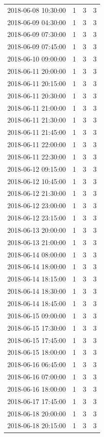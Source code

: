 \begin{tabular}{lrrr}
2018-06-08 10:30:00 & 1 & 3 & 3 \\
2018-06-09 04:30:00 & 1 & 3 & 3 \\
2018-06-09 07:30:00 & 1 & 3 & 3 \\
2018-06-09 07:45:00 & 1 & 3 & 3 \\
2018-06-10 09:00:00 & 1 & 3 & 3 \\
2018-06-11 20:00:00 & 1 & 3 & 3 \\
2018-06-11 20:15:00 & 1 & 3 & 3 \\
2018-06-11 20:30:00 & 1 & 3 & 3 \\
2018-06-11 21:00:00 & 1 & 3 & 3 \\
2018-06-11 21:30:00 & 1 & 3 & 3 \\
2018-06-11 21:45:00 & 1 & 3 & 3 \\
2018-06-11 22:00:00 & 1 & 3 & 3 \\
2018-06-11 22:30:00 & 1 & 3 & 3 \\
2018-06-12 09:15:00 & 1 & 3 & 3 \\
2018-06-12 10:45:00 & 1 & 3 & 3 \\
2018-06-12 21:30:00 & 1 & 3 & 3 \\
2018-06-12 23:00:00 & 1 & 3 & 3 \\
2018-06-12 23:15:00 & 1 & 3 & 3 \\
2018-06-13 20:00:00 & 1 & 3 & 3 \\
2018-06-13 21:00:00 & 1 & 3 & 3 \\
2018-06-14 08:00:00 & 1 & 3 & 3 \\
2018-06-14 18:00:00 & 1 & 3 & 3 \\
2018-06-14 18:15:00 & 1 & 3 & 3 \\
2018-06-14 18:30:00 & 1 & 3 & 3 \\
2018-06-14 18:45:00 & 1 & 3 & 3 \\
2018-06-15 09:00:00 & 1 & 3 & 3 \\
2018-06-15 17:30:00 & 1 & 3 & 3 \\
2018-06-15 17:45:00 & 1 & 3 & 3 \\
2018-06-15 18:00:00 & 1 & 3 & 3 \\
2018-06-16 06:45:00 & 1 & 3 & 3 \\
2018-06-16 07:00:00 & 1 & 3 & 3 \\
2018-06-16 18:00:00 & 1 & 3 & 3 \\
2018-06-17 17:45:00 & 1 & 3 & 3 \\
2018-06-18 20:00:00 & 1 & 3 & 3 \\
2018-06-18 20:15:00 & 1 & 3 & 3 \\

\end{tabular}
